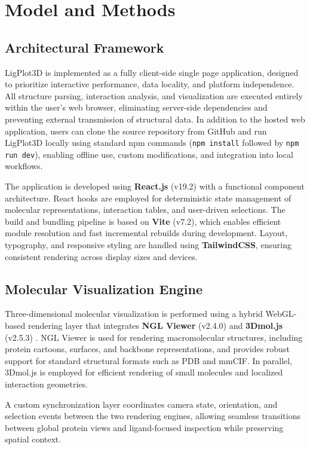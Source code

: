 \documentclass[journal=jacsat,manuscript=article]{achemso}
\begin{document}
\section{Model and Methods}

\subsection{Architectural Framework}
LigPlot3D is implemented as a fully client-side single page application, designed to prioritize interactive performance, data locality, and platform independence. All structure parsing, interaction analysis, and visualization are executed entirely within the user’s web browser, eliminating server-side dependencies and preventing external transmission of structural data. In addition to the hosted web application, users can clone the source repository from GitHub and run LigPlot3D locally using standard npm commands (\texttt{npm install} followed by \texttt{npm run dev}), enabling offline use, custom modifications, and integration into local workflows.

The application is developed using \textbf{React.js} (v19.2) with a functional component architecture. React hooks are employed for deterministic state management of molecular representations, interaction tables, and user-driven selections. The build and bundling pipeline is based on \textbf{Vite} (v7.2), which enables efficient module resolution and fast incremental rebuilds during development. Layout, typography, and responsive styling are handled using \textbf{TailwindCSS}, ensuring consistent rendering across display sizes and devices.

\subsection{Molecular Visualization Engine}
Three-dimensional molecular visualization is performed using a hybrid WebGL-based rendering layer that integrates \textbf{NGL Viewer} (v2.4.0) \cite{rose2015ngl,rose2018ngl} and \textbf{3Dmol.js} (v2.5.3) \cite{rego20153dmol}. NGL Viewer is used for rendering macromolecular structures, including protein cartoons, surfaces, and backbone representations, and provides robust support for standard structural formats such as PDB and mmCIF. In parallel, 3Dmol.js is employed for efficient rendering of small molecules and localized interaction geometries.

A custom synchronization layer coordinates camera state, orientation, and selection events between the two rendering engines, allowing seamless transitions between global protein views and ligand-focused inspection while preserving spatial context.
\end{document}

